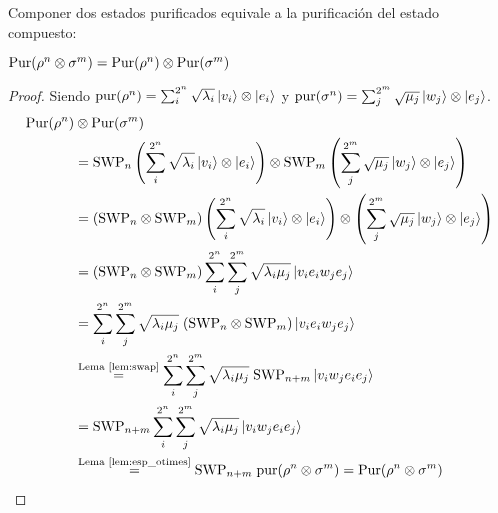 \begin{teorema}
\label{teo:pur_compose}
Componer dos estados purificados equivale a la purificación del estado compuesto:

$\text{Pur}(\rho^n \otimes \sigma^m) = \text{Pur}(\rho^n) \otimes \text{Pur}(\sigma^m)$

\end{teorema}
\begin{proof}
Siendo $\text{pur}(\rho^n) = \sum_i^{2^n} \sqrt{\lambda_i} \ket{v_i}\otimes\ket{e_i}$ y $\text{pur}(\sigma^n) = \sum_j^{2^m} \sqrt{\mu_j} \ket{w_j}\otimes\ket{e_j}$.
\begin{align*}
\text{Pur}(\rho^n) &\otimes \text{Pur}(\sigma^m) \\
&= \text{SWP}_n\left( \sum_i^{2^n} \sqrt{\lambda_i} \ket{v_i}\otimes\ket{e_i}\right) \otimes \text{SWP}_m\left(\sum_j^{2^m} \sqrt{\mu_j} \ket{w_j}\otimes\ket{e_j}\right) \\
&= (\text{SWP}_n \otimes \text{SWP}_m) \left( \sum_i^{2^n} \sqrt{\lambda_i} \ket{v_i}\otimes\ket{e_i}\right) \otimes \left(\sum_j^{2^m} \sqrt{\mu_j} \ket{w_j}\otimes\ket{e_j}\right)\\
&= (\text{SWP}_n \otimes \text{SWP}_m) \sum_i^{2^n} \sum_j^{2^m} \sqrt{\lambda_i \mu_j} \ket{v_i e_i w_j e_j} \\
&= \sum_i^{2^n} \sum_j^{2^m} \sqrt{\lambda_i \mu_j}\; (\text{SWP}_n \otimes \text{SWP}_m)\ket{v_i e_i w_j e_j} \\
&\stackrel{\textrm{Lema~\ref{lem:swap}}}{=} \sum_i^{2^n} \sum_j^{2^m} \sqrt{\lambda_i \mu_j}\; \text{SWP}_{n+m}\ket{v_i w_j e_i e_j} \\
&= \text{SWP}_{n+m} \sum_i^{2^n} \sum_j^{2^m} \sqrt{\lambda_i \mu_j} \ket{v_i w_j e_i e_j} \\
&\stackrel{\textrm{Lema~\ref{lem:esp_otimes}}}{=} \text{SWP}_{n+m} \;\text{pur}(\rho^n\otimes \sigma^m) = \text{Pur}(\rho^n\otimes \sigma^m)
\end{align*}
\end{proof}

